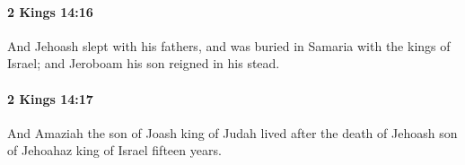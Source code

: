 		\paragraph{2 Kings 14:16} %
			\label{2KINGS-14-16}

			And Jehoash slept with his fathers, and was buried in Samaria with the kings of Israel; and Jeroboam his son reigned in his stead.


		\paragraph{2 Kings 14:17} %
			\label{2KINGS-14-17}

			And Amaziah the son of Joash king of Judah lived after the death of Jehoash son of Jehoahaz king of Israel fifteen years.



